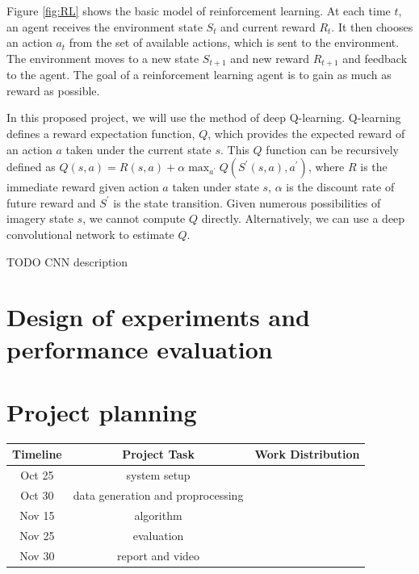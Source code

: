 \documentclass[a4paper]{article}
\begin{document}
Figure \ref{fig:RL} shows the basic model of reinforcement learning. At each time $t$, an agent
receives the environment state $S_t$ and current reward $R_t$. It then chooses an action $a_t$
from the set of available actions, which is sent to the environment. The environment moves
to a new state $S_{t+1}$ and new reward $R_{t+1}$ and feedback to the agent. The goal of a
reinforcement learning agent is to gain as much as reward as possible.


In this proposed project, we will use the method of deep Q-learning. Q-learning defines a reward
expectation function, $Q$, which provides the expected reward of an action $a$ taken under the
current state $s$. This $Q$ function can be recursively defined as $Q(s,a) = R(s,a) + \alpha
\max_{a^{'}} Q(S^{'}(s,a),a^{'})$, where $R$ is the immediate reward given action $a$ taken under
state $s$, $\alpha$ is the discount rate of future reward and $S^{'}$ is the state transition.
Given numerous possibilities of imagery state $s$, we cannot compute $Q$ directly. Alternatively,
we can use a deep convolutional network to estimate $Q$.

TODO CNN description\\

\section{Design of experiments and performance evaluation}


\section {Project planning}

\begin{center}
    \begin{tabular}{ | c | c | c | } 
        \hline
        Timeline & Project Task & Work Distribution   \\ 
        \hline
        Oct 25   & system setup &   \\ 
        \hline
        Oct 30   & data generation and proprocessing &   \\ 
        \hline
        Nov 15   & algorithm  &   \\ 
        \hline
        Nov 25   & evaluation  &   \\ 
        \hline
        Nov 30   & report and video  &   \\ 
        \hline
    \end{tabular}
\end{center}
\end{document}
